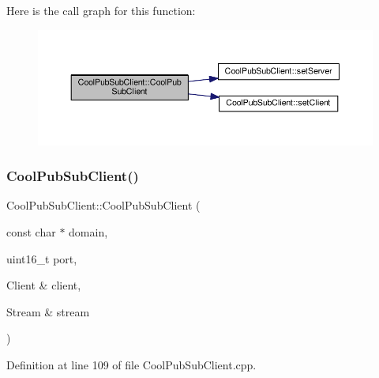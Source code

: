 Here is the call graph for this function\+:
\nopagebreak
\begin{figure}[H]
\begin{center}
\leavevmode
\includegraphics[width=350pt]{class_cool_pub_sub_client_a469eefe7429f0cbb6d7d443b52488411_cgraph}
\end{center}
\end{figure}
\mbox{\label{class_cool_pub_sub_client_a103e7286407babde84d63bb735c4e4b6}} 
\subsubsection{\texorpdfstring{Cool\+Pub\+Sub\+Client()}{CoolPubSubClient()}\hspace{0.1cm}{\footnotesize\ttfamily [12/14]}}
{\footnotesize\ttfamily Cool\+Pub\+Sub\+Client\+::\+Cool\+Pub\+Sub\+Client (\begin{DoxyParamCaption}\item[{const char $\ast$}]{domain,  }\item[{uint16\+\_\+t}]{port,  }\item[{Client \&}]{client,  }\item[{Stream \&}]{stream }\end{DoxyParamCaption})}



Definition at line 109 of file Cool\+Pub\+Sub\+Client.\+cpp.

